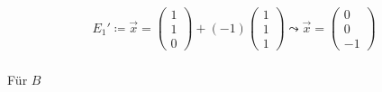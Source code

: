 \begin{gather}
E_1'\coloneqq \vec{x} = \begin{pmatrix}
1\\1\\0
\end{pmatrix}+(-1) \begin{pmatrix}
1\\1\\1
\end{pmatrix} 
\leadsto \vec{x} =
\begin{pmatrix}
0\\0\\-1
\end{pmatrix}
\end{gather}\\


Für \ensuremath{B}  %

